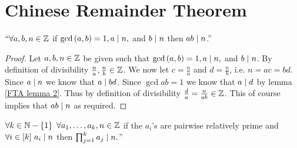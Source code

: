     \section{Chinese Remainder Theorem}
        \begin{lemma}
            $``\forall a, b, n \in \mathbb{Z}$ if $\mathrm{gcd}\left(a, b\right) = 1, a \mid n,$ and $b \mid n$
            then $ab \mid n$.''
            \label{CRT uniquness lemma}
        \end{lemma}
        \begin{proof}
            Let $a, b, n \in \mathbb{Z}$ be given such that $\mathrm{gcd}\left(a, b\right) = 1, a \mid n,$ and
            $b \mid n$. By definition of divisibility $\frac{n}{a}, \frac{n}{b} \in \mathbb{Z}$.
            We now let $c = \frac{n}{a}$ and $d = \frac{n}{b}$, i.e. $n = ac = bd$. Since $a \mid n$
            we know that $a \mid bd$. Since $\gcd{a}{b} = 1$ we know that $a \mid d$ by 
            lemma \ref{FTA lemma 2}. Thus by definition of divisibility $\frac{d}{a} = \frac{n}{ab} \in \mathbb{Z}$.
            This of course implies that $ab \mid n$ as required. \QED
        \end{proof}
        \begin{corollary}
            $\forall k \in \setsub{\set{N}}{\Set{1}} \ \forall a_1, \dots, a_k, n \in \set{Z}$ if
            the $a_i$'s are pairwise relatively prime and $\forall i \in [k] \ a_i \mid n$ then
            $\prod_{j = 1}^k a_j \mid n.$''
            \label{CRT uniquness corollary}
        \end{corollary}
